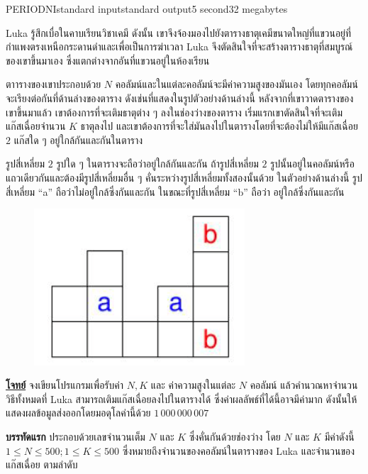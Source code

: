\documentclass[11pt,a4paper]{article}
\begin{document}
\begin{problem}{PERIODNI}{standard input}{standard output}{5 second}{32 megabytes}

Luka รู้สึกเบื่อในคาบเรียนวิชาเคมี ดังนั้น เขาจึงจ้องมองไปยังตารางธาตุเคมีขนาดใหญ่ที่แขวนอยู่ที่กำแพงตรงเหนือกระดานดำและเพื่อเป็นการฆ่าเวลา   Luka จึงตัดสินใจที่จะสร้างตารางธาตุที่สมบูรณ์ของเขาขึ้นมาเอง ซึ่งแตกต่างจากอันที่แขวนอยู่ในห้องเรียน

ตาารางของเขาประกอบด้วย $N$ คอลัมน์และในแต่ละคอลัมน์จะมีค่าความสูงของมันเอง โดยทุกคอลัมน์จะเรียงต่อกันที่ด้านล่างของตาราง ดังเช่นที่แสดงในรูปตัวอย่างด้านล่างนี้   หลังจากที่เขาวาดตารางของเขาขึ้นมาแล้ว เขาต้องการที่จะเติมธาตุต่าง ๆ ลงในช่องว่างของตาราง เริ่มแรกเขาตัดสินใจที่จะเติมแก๊สเฉื่อยจำนวน $K$ ธาตุลงไป   และเขาต้องการที่จะใส่มันลงไปในตารางโดยที่จะต้องไม่ให้มีแก๊สเฉื่อย $2$ แก๊สใด ๆ อยู่ใกล้กันและกันในตาราง

รูปสี่เหลี่ยม $2$ รูปใด ๆ ในตารางจะถือว่าอยู่ใกล้กันและกัน   ถ้ารูปสี่เหลี่ยม $2$ รูปนั้นอยู่ในคอลัมน์หรือแถวเดียวกันและต้องมีรูปสี่เหลี่ยมอื่น ๆ คั่นระหว่างรูปสี่เหลี่ยมทั้งสองนั้นด้วย  ในตัวอย่างด้านล่างนี้ รูปสี่เหลี่ยม “a” ถือว่าไม่อยู่ใกล้ซึ่งกันและกัน   ในขณะที่รูปสี่เหลี่ยม “b” ถือว่า อยู่ใกล้ซึ่งกันและกัน

\begin{figure}[!h]
\centering
\includegraphics[width=0.7\textwidth]{../latex/img/1098/1098.png}
\end{figure}

\bigskip
\underline{\textbf{โจทย์}}  จงเขียนโปรแกรมเพื่อรับค่า $N, K$ และ ค่าความสูงในแต่ละ $N$ คอลัมน์   แล้วคำนวณหาจำนวนวิธีทั้งหมดที่ Luka สามารถเติมแก๊สเฉื่อยลงไปในตารางได้   ซึ่งค่าผลลัพธ์ที่ได้นี้อาจมีค่ามาก   ดังนั้นให้แสดงผลข้อมูลส่งออกโดยมอดุโลค่านี้ด้วย $1\,000\,000\,007$


\InputFile

\textbf{บรรทัดแรก}   ประกอบด้วยเลขจำนวนเต็ม $N$ และ $K$ ซึ่งคั่นกันด้วยช่องว่าง   โดย  $N$ และ $K$ มีค่าดังนี้ $1 \leq N \leq 500; 1 \leq K \leq 500$ ซึ่งหมายถึงจำนวนของคอลัมน์ในตารางของ Luka และจำนวนของแก๊สเฉื่อย ตามลำดับ


\end{problem}
\end{document}
